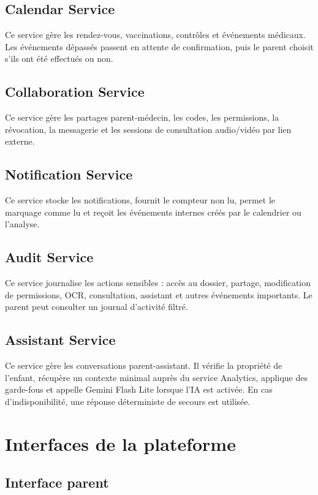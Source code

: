 \subsection{Calendar Service}
Ce service gère les rendez-vous, vaccinations, contrôles et événements médicaux. Les événements dépassés passent en attente de confirmation, puis le parent choisit s'ils ont été effectués ou non.

\subsection{Collaboration Service}
Ce service gère les partages parent-médecin, les codes, les permissions, la révocation, la messagerie et les sessions de consultation audio/vidéo par lien externe.

\subsection{Notification Service}
Ce service stocke les notifications, fournit le compteur non lu, permet le marquage comme lu et reçoit les événements internes créés par le calendrier ou l'analyse.

\subsection{Audit Service}
Ce service journalise les actions sensibles : accès au dossier, partage, modification de permissions, OCR, consultation, assistant et autres événements importants. Le parent peut consulter un journal d'activité filtré.

\subsection{Assistant Service}
Ce service gère les conversations parent-assistant. Il vérifie la propriété de l'enfant, récupère un contexte minimal auprès du service Analytics, applique des garde-fous et appelle Gemini Flash Lite lorsque l'IA est activée. En cas d'indisponibilité, une réponse déterministe de secours est utilisée.

\section{Interfaces de la plateforme}
\label{sec:interfaces}

\subsection{Interface parent}

